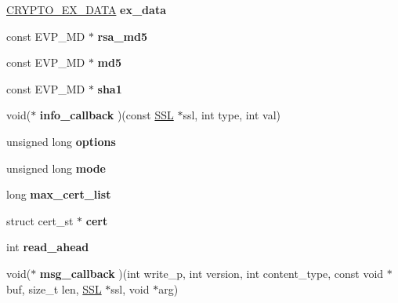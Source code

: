 \begin{DoxyCompactItemize}
\hyperlink{structcrypto__ex__data__st}{C\+R\+Y\+P\+T\+O\+\_\+\+E\+X\+\_\+\+D\+A\+TA} {\bfseries ex\+\_\+data}
\item 
\mbox{\label{structssl__ctx__st_a297d3bf2019076959d84c41a41e7ac3b}} 
const E\+V\+P\+\_\+\+MD $\ast$ {\bfseries rsa\+\_\+md5}
\item 
\mbox{\label{structssl__ctx__st_a0d2c62fc7903597eef4c4890ba327a16}} 
const E\+V\+P\+\_\+\+MD $\ast$ {\bfseries md5}
\item 
\mbox{\label{structssl__ctx__st_ae6ea4c79f3be1d3c103b290e08009204}} 
const E\+V\+P\+\_\+\+MD $\ast$ {\bfseries sha1}
\item 
\mbox{\label{structssl__ctx__st_aad6ab81d36b3ea41bc75aa86586396dc}} 
void($\ast$ {\bfseries info\+\_\+callback} )(const \hyperlink{structssl__st}{S\+SL} $\ast$ssl, int type, int val)
\item 
\mbox{\label{structssl__ctx__st_aeca7f42401b9a9465d47a206f155f6ba}} 
unsigned long {\bfseries options}
\item 
\mbox{\label{structssl__ctx__st_a15675b65ff5a91cc12c75247cec9c90e}} 
unsigned long {\bfseries mode}
\item 
\mbox{\label{structssl__ctx__st_a7ee4c1615f56a2034547f06d040613df}} 
long {\bfseries max\+\_\+cert\+\_\+list}
\item 
\mbox{\label{structssl__ctx__st_a12fd74ab996b83c38cd73136a1163471}} 
struct cert\+\_\+st $\ast$ {\bfseries cert}
\item 
\mbox{\label{structssl__ctx__st_a454cbb1294b6b36ab36cff39c541ba70}} 
int {\bfseries read\+\_\+ahead}
\item 
\mbox{\label{structssl__ctx__st_ada261e72ed5d3ce460ca6dcf34ec53dd}} 
void($\ast$ {\bfseries msg\+\_\+callback} )(int write\+\_\+p, int version, int content\+\_\+type, const void $\ast$buf, size\+\_\+t len, \hyperlink{structssl__st}{S\+SL} $\ast$ssl, void $\ast$arg)
\item 

\end{DoxyCompactItemize}
